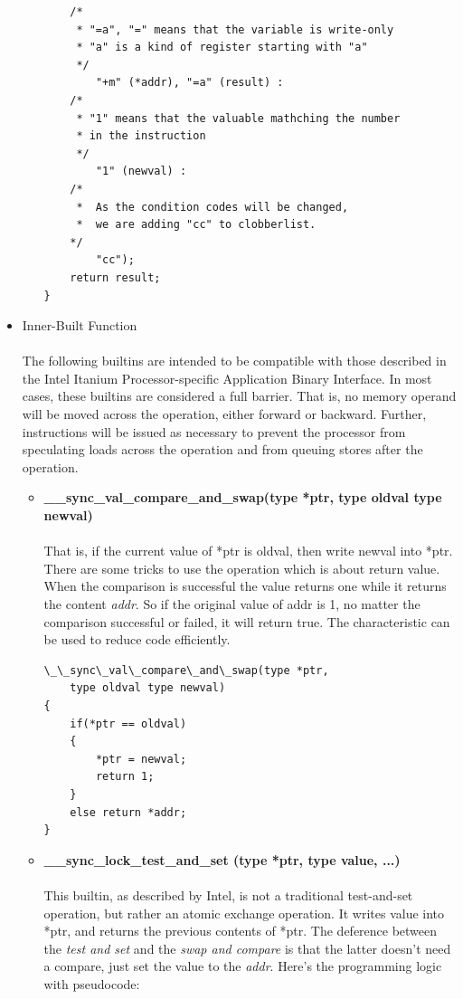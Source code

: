 \documentclass{article}
\begin{document}
\begin{itemize}
\begin{itemize}
\begin{lstlisting}
	/*
	 * "=a", "=" means that the variable is write-only
	 * "a" is a kind of register starting with "a"
	 */ 
		"+m" (*addr), "=a" (result) : 
	/*
	 * "1" means that the valuable mathching the number 
	 * in the instruction
	 */
		"1" (newval) : 
	/*
	 *  As the condition codes will be changed, 
	 *  we are adding "cc" to clobberlist.
	*/
		"cc");
	return result;
}
			\end{lstlisting}
		\end{itemize}
		\item Inner-Built Function \\ \\
		The following builtins are intended to be compatible with those described in the Intel Itanium Processor-specific Application Binary Interface. In most cases, these builtins are considered a full barrier. That is, no memory operand will be moved across the operation, either forward or backward. Further, instructions will be issued as necessary to prevent the processor from speculating loads across the operation and from queuing stores after the operation. \\
		\begin{itemize}
			\item \textbf{\_\_sync\_val\_compare\_and\_swap(type *ptr, type oldval type newval)}  \\ \\
			That is, if the current value of *ptr is oldval, then write newval into *ptr. There are some tricks to use the operation which is about return value. When the comparison is successful the value returns one while it returns the content \emph{addr}. So if the original value of addr is 1, no matter the comparison successful or failed, it will return true. The characteristic can be used to reduce code efficiently. \\
			\begin{lstlisting}
\_\_sync\_val\_compare\_and\_swap(type *ptr, 
	type oldval type newval)
{
	if(*ptr == oldval)
	{
		*ptr = newval;
		return 1;
	}
	else return *addr;
}
			\end{lstlisting}
			\item \textbf{\_\_sync\_lock\_test\_and\_set (type *ptr, type value, ...)} \\ \\
			This builtin, as described by Intel, is not a traditional test-and-set operation, but rather an atomic exchange operation. It writes value into *ptr, and returns the previous contents of *ptr. The deference between the \emph{test and set} and the \emph{swap and compare} is that the latter doesn't need a compare, just set the value to the \emph{addr}. Here's the programming logic with pseudocode:

\end{itemize}
\end{itemize}
\end{document}
